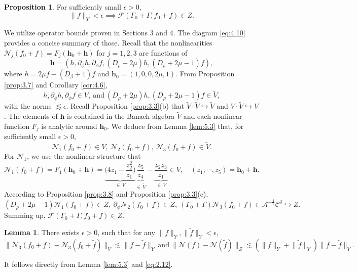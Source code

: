 \documentclass[11pt]{article}
\makeatletter
\renewenvironment{proof}[1][\proofname]{\par
  \vspace{-.7\topsep}%
  \pushQED{\qed}%
  \normalfont
  \topsep0pt \partopsep0pt %
  \trivlist
  \item[\hskip\labelsep
        \itshape
    #1\@addpunct{.}]\ignorespaces
}{%
  \popQED\endtrivlist\@endpefalse
  \addvspace{6pt plus 6pt} %
}
\theoremstyle{definition}
\newtheorem{prop}[theorem]{Proposition}
\newtheorem{lemma}[theorem]{Lemma}
\theoremstyle{remark}
\numberwithin{equation}{section}
\newcommand{\mbf}{\mathbf}
\newcommand{\mcal}{\mathcal}
\renewcommand{\tilde}{\widetilde}
\newcommand{\del}{\partial}
\newcommand{\norm}[1]{\lVert #1 \rVert}
\makeatother
\begin{document}
\begin{prop}
For sufficiently small $\epsilon > 0$,
\[\norm{f}_{Y} < \epsilon \implies \mcal{F}(\Gamma_0 + \Gamma, f_0 + f) \in Z.\]
\end{prop}
\begin{proof}
We utilize operator bounds proven in Sections 3 and 4. The diagram \eqref{eq:4.10} provides a concise summary of those. Recall that the nonlinearities $\mcal{N}_j(f_0 + f) = F_j(\mbf{h}_0 + \mbf{h})$ for $j=1,2,3$ are functions of
\[\mbf{h} = (h, \del_\phi h, \del_\phi f, (D_\rho + 2\mu) h, (D_\rho + 2\mu - 1)f),\]
where $h = 2\mu f - (D_\beta + 1)f$ and $\mbf{h}_0 = (1, 0, 0, 2\mu, 1)$. From Proposition \ref{prop:3.7} and Corollary \ref{cor:4.6},
\[h, \del_\phi h, \del_\phi f \in V,~\text{and}~(D_\rho + 2\mu) h, (D_\rho + 2\mu - 1) f \in \tilde{V},\]
with the norms $\lesssim\epsilon$. Recall Proposition \ref{prop:3.3}(b) that $\tilde{V} \cdot \tilde{V} \hookrightarrow \tilde{V}$ and $V \cdot \tilde{V} \hookrightarrow V$. The elements of $\mbf{h}$ is contained in the Banach algebra $\tilde{V}$ and each nonlinear function $F_j$ is analytic around $\mbf{h}_0$. We deduce from Lemma \ref{lem:5.3} that, for sufficiently small $\epsilon > 0$,
\[\mcal{N}_1(f_0 + f) \in V, ~\mcal{N}_2(f_0 + f), ~\mcal{N}_3(f_0 + f) \in \tilde{V}.\]
For $\mcal{N}_1$, we use the nonlinear structure that
\[\mcal{N}_1(f_0 + f) = F_1(\mbf{h}_0 + \mbf{h}) = \underbrace{\bigg(4z_1 - \frac{z_2^2}{z_1} \bigg)}_{\in \, V} \underbrace{\frac{z_5}{z_4}}_{\in \,\tilde{V}} - \underbrace{\frac{z_2 z_3}{z_1}}_{\in \,V} \in V, \quad (z_1, \cdots, z_5) = \mbf{h}_0 + \mbf{h}.\]
According to Proposition \ref{prop:3.8} and Proposition \ref{prop:3.3}(c),
\[(D_\rho + 2\mu - 1)\mcal{N}_1(f_0 + f) \in Z,~\del_\phi \mcal{N}_2(f_0 + f) \in Z, ~(\Gamma_0 + \Gamma) \mcal{N}_3 (f_0 + f) \in \mcal{A}^{-\frac{1}{2}} \mcal{C}^\delta \hookrightarrow Z.\]
Summing up, $\mcal{F}(\Gamma_0 + \Gamma, f_0 + f) \in Z$.
\end{proof}

\begin{lemma} \label{lem:5.2}
There exists $\epsilon > 0$, such that for any $\norm{f}_Y, \norm{\tilde{f}}_Y < \epsilon$,
\[\norm{\mcal{N}_3(f_0 + f) - \mcal{N}_3(f_0 + \tilde{f})}_{\tilde{V}} \lesssim \norm{f-\tilde{f}}_Y~ \text{and}~\norm{\mcal{N}(f) - \mcal{N}(\tilde{f})}_Z \lesssim (\norm{f}_Y + \norm{\tilde{f}}_Y) \norm{f-\tilde{f}}_Y.\]
\end{lemma}
\begin{proof}
It follows directly from Lemma \ref{lem:5.3} and \eqref{eq:2.12}.
\end{proof}
\end{document}
